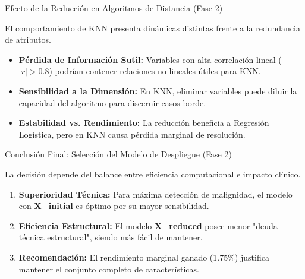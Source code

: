 \documentclass{beamer}
\begin{document}
	\begin{frame}{Efecto de la Reducción en Algoritmos de Distancia (Fase 2)}
		
		El comportamiento de KNN presenta dinámicas distintas frente a la redundancia de atributos.
		
		\begin{itemize}
			\item<2-> \textbf{Pérdida de Información Sutil:} Variables con alta correlación lineal ($|r| > 0.8$) podrían contener relaciones no lineales útiles para KNN.
			
			\item<3-> \textbf{Sensibilidad a la Dimensión:} En KNN, eliminar variables puede diluir la capacidad del algoritmo para discernir casos borde.
			
			\item<4-> \textbf{Estabilidad vs. Rendimiento:} La reducción beneficia a Regresión Logística, pero en KNN causa pérdida marginal de resolución.
		\end{itemize}
		
	\end{frame}
	
	\begin{frame}{Conclusión Final: Selección del Modelo de Despliegue (Fase 2)}
		
		La decisión depende del balance entre eficiencia computacional e impacto clínico.
		
		\begin{enumerate}
			\item<2-> \textbf{Superioridad Técnica:} Para máxima detección de malignidad, el modelo con \textbf{X\_initial} es óptimo por su mayor sensibilidad.
			
			\item<3-> \textbf{Eficiencia Estructural:} El modelo \textbf{X\_reduced} posee menor "deuda técnica estructural", siendo más fácil de mantener.
			
			\item<4-> \textbf{Recomendación:} El rendimiento marginal ganado (1.75\%) justifica mantener el conjunto completo de características.
		\end{enumerate}
		
	\end{frame}
	
\end{document}
